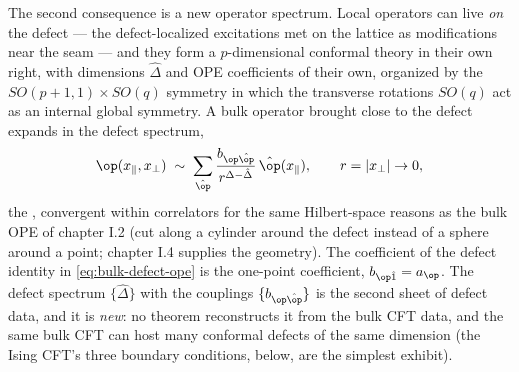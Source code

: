 The second consequence is a new operator spectrum. Local operators can
live \emph{on} the defect --- the defect-localized excitations met on
the lattice as modifications near the seam --- and they form a
$p$-dimensional conformal theory in their own right, with dimensions
$\hat\Delta$ and OPE coefficients of their own, organized by the
$SO(p+1,1) \times SO(q)$ symmetry in which the transverse rotations
$SO(q)$ act as an internal global symmetry. A bulk operator brought
close to the defect expands in the defect spectrum,
\begin{equation}
\op(x_\parallel, x_\perp) \;\sim\; \sum_{\hat\op}
\frac{b_{\op\hat\op}}{r^{\Delta - \hat\Delta}}\,
\hat\op(x_\parallel), \qquad r = |x_\perp| \to 0,
\label{eq:bulk-defect-ope}
\end{equation}
the , convergent within correlators for the
same Hilbert-space reasons as the bulk OPE of chapter I.2 (cut along a
cylinder around the defect instead of a sphere around a point; chapter
I.4 supplies the geometry). The coefficient of the defect identity in
\eqref{eq:bulk-defect-ope} is the one-point coefficient,
$b_{\op\hat 1} = a_\op$. The defect spectrum $\{\hat\Delta\}$ with the
couplings $\{b_{\op\hat\op}\}$ is the second sheet of defect data, and
it is \emph{new}: no theorem reconstructs it from the bulk CFT data,
and the same bulk CFT can host many conformal defects of the same
dimension (the Ising CFT's three boundary conditions, below, are the
simplest exhibit).

